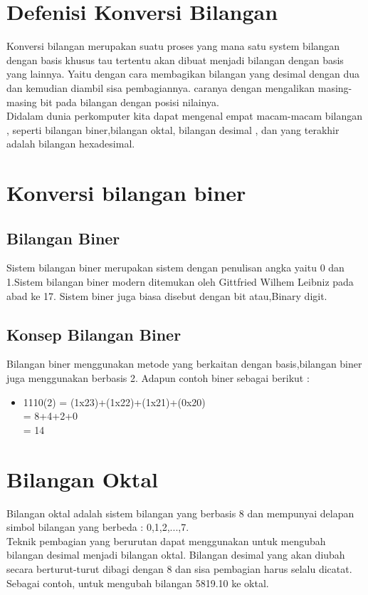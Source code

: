 \section{Defenisi Konversi Bilangan}
Konversi bilangan merupakan suatu proses yang mana satu system bilangan dengan basis khusus tau tertentu akan dibuat menjadi bilangan dengan basis yang lainnya. 
Yaitu dengan cara membagikan bilangan yang desimal dengan dua dan kemudian diambil sisa pembagiannya.
caranya dengan mengalikan masing-masing bit pada bilangan dengan posisi nilainya.
\\Didalam dunia perkomputer kita dapat mengenal empat macam-macam bilangan , seperti bilangan biner,bilangan oktal, bilangan desimal , dan yang terakhir adalah bilangan hexadesimal.
\section{Konversi bilangan biner}
\subsection{Bilangan Biner}
Sistem bilangan biner merupakan sistem dengan penulisan angka yaitu 0 dan 1.Sistem bilangan biner  modern ditemukan oleh Gittfried Wilhem Leibniz pada abad ke 17. Sistem biner juga biasa disebut dengan bit atau,Binary digit.
\subsection{Konsep Bilangan Biner}
Bilangan biner menggunakan metode yang berkaitan dengan basis,bilangan biner juga menggunakan berbasis 2. Adapun contoh biner sebagai berikut : \\
\begin{itemize}
\item 1110(2) = (1x23)+(1x22)+(1x21)+(0x20)\\
   	  = 8+4+2+0\\
             = 14  
\end{itemize}

\section{Bilangan Oktal} %
Bilangan oktal adalah sistem bilangan yang berbasis 8 dan mempunyai delapan simbol bilangan yang berbeda : 0,1,2,...,7.
\\
	Teknik pembagian yang berurutan dapat menggunakan untuk mengubah bilangan desimal menjadi bilangan oktal. Bilangan desimal yang akan diubah secara berturut-turut dibagi dengan 8 dan sisa pembagian harus selalu dicatat. Sebagai contoh, untuk mengubah bilangan 5819.10 ke oktal.

